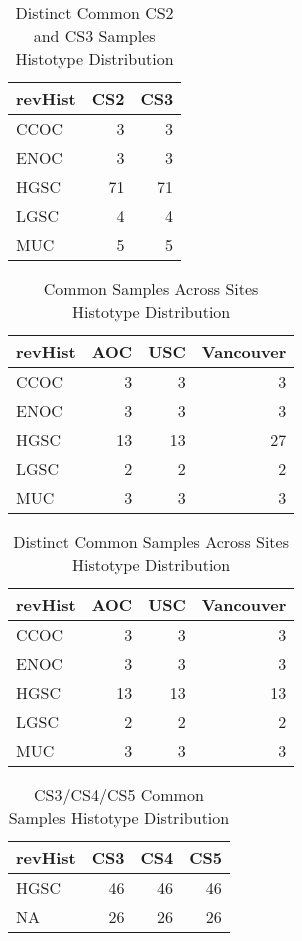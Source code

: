 \documentclass[
]{report}
\begin{document}
\begin{table}

\caption{\label{tab:common-cs2-cs3-dist-distinct}Distinct Common CS2 and CS3 Samples Histotype Distribution}
\centering
\begin{tabular}[t]{l|r|r}
\hline
revHist & CS2 & CS3\\
\hline
CCOC & 3 & 3\\
\hline
ENOC & 3 & 3\\
\hline
HGSC & 71 & 71\\
\hline
LGSC & 4 & 4\\
\hline
MUC & 5 & 5\\
\hline
\end{tabular}
\end{table}

\begin{table}

\caption{\label{tab:common-dist-sites}Common Samples Across Sites Histotype Distribution}
\centering
\begin{tabular}[t]{l|r|r|r}
\hline
revHist & AOC & USC & Vancouver\\
\hline
CCOC & 3 & 3 & 3\\
\hline
ENOC & 3 & 3 & 3\\
\hline
HGSC & 13 & 13 & 27\\
\hline
LGSC & 2 & 2 & 2\\
\hline
MUC & 3 & 3 & 3\\
\hline
\end{tabular}
\end{table}

\begin{table}

\caption{\label{tab:common-dist-sites-distinct}Distinct Common Samples Across Sites Histotype Distribution}
\centering
\begin{tabular}[t]{l|r|r|r}
\hline
revHist & AOC & USC & Vancouver\\
\hline
CCOC & 3 & 3 & 3\\
\hline
ENOC & 3 & 3 & 3\\
\hline
HGSC & 13 & 13 & 13\\
\hline
LGSC & 2 & 2 & 2\\
\hline
MUC & 3 & 3 & 3\\
\hline
\end{tabular}
\end{table}

\begin{table}

\caption{\label{tab:cs345-overlap}CS3/CS4/CS5 Common Samples Histotype Distribution}
\centering
\begin{tabular}[t]{l|r|r|r}
\hline
revHist & CS3 & CS4 & CS5\\
\hline
HGSC & 46 & 46 & 46\\
\hline
NA & 26 & 26 & 26\\
\hline
\end{tabular}
\end{table}
\end{document}

